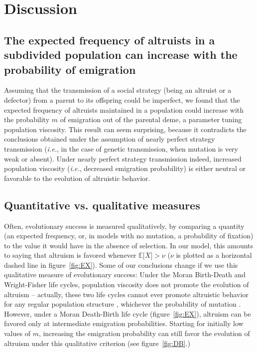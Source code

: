 \documentclass[11pt, letterpaper]{article}
\newcommand{\ie}{\textit{i.e.}}
\newcommand{\Esp}[1]{\mathbb{E}\big[ #1\big]}%
\newcommand{\mutbias}{\nu}
\begin{document}
\section*{Discussion}
\subsection*{The expected frequency of altruists in a subdivided population can increase with the probability of emigration}
Assuming that the transmission of a social strategy (being an altruist or a defector) from a parent to its offspring could be imperfect, we found that the expected frequency of altruists maintained in a population could increase with the probability $m$ of emigration out of the parental deme, a parameter tuning population viscosity. This result can seem surprising, because it contradicts the conclusions obtained under the assumption of nearly perfect strategy transmission (\ie, in the case of genetic transmission, when mutation is very weak or absent). Under nearly perfect strategy transmission indeed, increased population viscosity (\ie, decreased emigration probability) is either neutral \citep[][and dashed lines in figures~\ref{fig:EX}--]{Taylor1992islandmodel} or favorable \citep[][and dashed lines in figure~\ref{fig:EX}]{TaylorDayWild2007} to the evolution of altruistic behavior. 

\subsection*{Quantitative vs. qualitative measures}
Often, evolutionary success is measured qualitatively, by comparing a quantity (an expected frequency, or, in models with no mutation, a probability of fixation) to the value it would have in the absence of selection. In our model, this amounts to saying that altruism is favored whenever $\Esp{\overline{X}} > \mutbias$ ($\mutbias$ is plotted as a horizontal dashed line in figure~\ref{fig:EX}). 
Some of our conclusions change if we use this qualitative measure of evolutionary success: Under the Moran Birth-Death and Wright-Fisher life cycles, population viscosity does not promote the evolution of altruism -- actually, these two life cycles cannot ever promote altruistic behavior for any regular population structure \citep{Taylor2011}, whichever the probability of mutation \citep{Debarre2017}. 
However, under a Moran Death-Birth life cycle (figure~\ref{fig:EX}), altruism can be favored only at intermediate emigration probabilities. Starting for initially low values of $m$, increasing the emigration probability can still favor the evolution of altruism under this qualitative criterion (see figure~\ref{fig:DB}.)  
\end{document}
